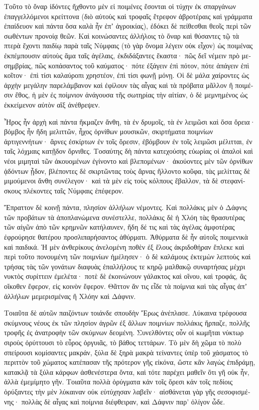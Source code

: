 \documentclass{book}
\begin{document}
\begin{pairs}
\begin{Leftside}
\begin{greek}
  Τοῦτο τὸ ὄναρ ἰδόντες ἤχθοντο μὲν εἰ ποιμένες ἔσονται οἱ τύχην ἐκ σπαργάνων ἐπαγγελλόμενοι κρείττονα (διὸ αὐτοὺς καὶ τροφαῖς ἔτρεφον ἁβροτέραις καὶ γράμματα ἐπαίδευον καὶ πάντα ὅσα καλὰ ἦν ἐπʼ ἀγροικίας), ἐδόκει δὲ πείθεσθαι θεοῖς περὶ τῶν σωθέντων προνοίᾳ θεῶν.  Καὶ κοινώσαντες ἀλλήλοις τὸ ὄναρ καὶ θύσαντες τῷ τὰ πτερὰ ἔχοντι παιδίῳ παρὰ ταῖς Νύμφαις (τὸ γὰρ ὄνομα λέγειν οὐκ εἶχον) ὡς ποιμένας ἐκπέμπουσιν αὐτοὺς ἅμα ταῖς ἀγέλαις, ἐκδιδάξαντες ἕκαστα· πῶς δεῖ νέμειν πρὸ μεσημβρίας,  πῶς κοπάσαντος τοῦ καύματος· πότε ἐξάγειν ἐπὶ πότον, πότε ἀπάγειν ἐπὶ κοῖτον· ἐπὶ τίσι καλαύροπι χρηστέον, ἐπὶ τίσι φωνῇ μόνῃ. Οἱ δὲ μάλα χαίροντες ὡς ἀρχὴν μεγάλην παρελάμβανον καὶ ἐφίλουν τὰς αἶγας καὶ τὰ πρόβατα μᾶλλον ἢ ποιμέσιν ἔθος, ἡ μὲν ἐς ποίμνιον ἀνάγουσα τῆς σωτηρίας τὴν αἰτίαν, ὁ δὲ μεμνημένος ὡς ἐκκείμενον αὐτὸν αἲξ ἀνέθρεψεν.
\pend


  Ἦρος ἦν ἀρχὴ καὶ πάντα ἤκμαζεν ἄνθη, τὰ ἐν δρυμοῖς, τὰ ἐν λειμῶσι καὶ ὅσα ὄρεια· βόμβος ἦν ἤδη μελιττῶν, ἦχος ὀρνίθων μουσικῶν, σκιρτήματα ποιμνίων ἀρτιγεννήτων· ἄρνες ἐσκίρτων ἐν τοῖς ὄρεσιν, ἐβόμβουν ἐν τοῖς λειμῶσι μέλιτται, ἐν ταῖς λόχμαις κατῇδον ὄρνιθες.  Τοσαύτης δὴ πάντα κατεχούσης εὐωρίας οἱ ἁπαλοὶ καὶ νέοι μιμηταὶ τῶν ἀκουομένων ἐγίνοντο καὶ βλεπομένων· ἀκούοντες μὲν τῶν ὀρνίθων ᾀδόντων ᾖδον, βλέποντες δὲ σκιρτῶντας τοὺς ἄρνας ἥλλοντο κοῦφα, τὰς μελίττας δὲ μιμούμενοι ἄνθη συνέλεγον· καὶ τὰ μὲν εἰς τοὺς κόλπους ἔβαλλον, τὰ δὲ στεφανίσκους πλέκοντες ταῖς Νύμφαις ἐπέφερον.
\pend


  Ἔπραττον δὲ κοινῇ πάντα, πλησίον ἀλλήλων νέμοντες. Καὶ πολλάκις μὲν ὁ Δάφνις τῶν προβάτων τὰ ἀποπλανώμενα συνέστελλε, πολλάκις δὲ ἡ Χλόη τὰς θρασυτέρας τῶν αἰγῶν ἀπὸ τῶν κρημνῶν κατήλαυνεν, ἤδη δέ τις καὶ τὰς ἀγέλας ἀμφοτέρας ἐφρούρησε θατέρου προσλιπαρήσαντος ἁθύρματι. Ἁθύρματα δὲ ἦν αὐτοῖς ποιμενικὰ καὶ παιδικά.  Ἡ μὲν ἀνθερίκους ἀνελομένη ποθὲν ἐξ ἕλους ἀκριδοθήραν ἔπλεκε καὶ περὶ τοῦτο πονουμένη τῶν ποιμνίων ἠμέλησεν· ὁ δὲ καλάμους ἐκτεμὼν λεπτοὺς καὶ τρήσας τὰς τῶν γονάτων διαφυὰς ἐπαλλήλους τε κηρῷ μαλθακῷ συναρτήσας μέχρι νυκτὸς συρίττειν ἐμελέτα·  ποτὲ δὲ ἐκοινώνουν γάλακτος καὶ οἴνου, καὶ τροφάς, ἃς οἴκοθεν ἔφερον, εἰς κοινὸν ἔφερον. Θᾶττον ἅν τις εἶδε τὰ ποίμνια καὶ τὰς αἶγας ἀπʼ ἀλλήλων μεμερισμένας ἢ Χλόην καὶ Δάφνιν.
\pend


  Τοιαῦτα δὲ αὐτῶν παιζόντων τοιάνδε σπουδὴν Ἔρως ἀνέπλασε. Λύκαινα τρέφουσα σκύμνους νέους ἐκ τῶν πλησίον ἀγρῶν ἐξ ἄλλων ποιμνίων πολλάκις ἥρπαζε, πολλῆς τροφῆς ἐς ἀνατροφὴν τῶν σκύμνων δεομένη.  Συνελθόντες οὖν οἱ κωμῆται νύκτωρ σιροὺς ὀρύττουσι τὸ εὖρος ὀργυιᾶς, τὸ βάθος τεττάρων. Τὸ μὲν δὴ χῶμα τὸ πολὺ σπείρουσι κομίσαντες μακράν, ξύλα δὲ ξηρὰ μακρὰ τείναντες ὑπὲρ τοῦ χάσματος τὸ περιττὸν τοῦ χώματος κατέπασαν τῆς πρότερον γῆς εἰκόνα, ὥστε κἂν λαγὼς ἐπιδράμῃ, κατακλᾷ τὰ ξύλα κάρφων ἀσθενέστερα ὄντα, καὶ τότε παρέχει μαθεῖν ὅτι γῆ οὐκ ἦν, ἀλλὰ ἐμεμίμητο γῆν. Τοιαῦτα πολλὰ ὀρύγματα κἀν τοῖς ὄρεσι κἀν τοῖς πεδίοις ὀρύξαντες τὴν μὲν λύκαιναν οὐκ εὐτύχησαν λαβεῖν· αἰσθάνεται γὰρ γῆς σεσοφισμένης· πολλὰς δὲ αἶγας καὶ ποίμνια διέφθειραν, καὶ Δάφνιν παρ’ ὀλίγον ὧδε.
\pend



\end{greek}
\end{Leftside}
\end{pairs}
\end{document}
